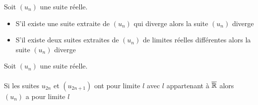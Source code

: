 \begin{defprop}
    Soit \((u_n)\) une suite réelle.
    \begin{itemize}
        \item S'il existe une suite extraite de \((u_n)\) qui diverge alors la suite \((u_n)\) diverge
        \item S'il existe deux suites extraites de \((u_n)\) de limites réelles différentes alors la suite \((u_n)\) diverge
    \end{itemize} 
\end{defprop}

\begin{defprop}
    Soit \((u_n)\) une suite réelle.\\~\\
    Si les suites \(u_{2n}\) et \((u_{2n+1})\) ont pour limite \(l\) avec \(l\) appartenant à \(\overline{\mathbb{R}}\) alors \((u_n)\) a pour limite \(l\)
\end{defprop}

